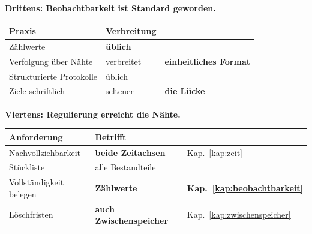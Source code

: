 \begin{aktuell}
\medskip
\textbf{Drittens: Beobachtbarkeit ist Standard geworden.}

\begin{center}
\renewcommand{\arraystretch}{1.45}
\begin{tabular}{@{}P{3.0cm}P{2.2cm}P{2.6cm}@{}}
\toprule
\textbf{Praxis} & \textbf{Verbreitung} & \\
\midrule
Zählwerte & \textcolor{gruen}{\textbf{üblich}} & \\
Verfolgung über Nähte & \textcolor{gruen}{verbreitet} & \textbf{einheitliches Format}\\
Strukturierte Protokolle & \textcolor{gruen}{üblich} & \\
Ziele schriftlich & \textcolor{mittel}{seltener} & \textcolor{akzent}{\textbf{die Lücke}}\\
\bottomrule
\end{tabular}
\end{center}

\begin{center}
\begin{minipage}{0.86\textwidth}
\end{minipage}
\end{center}

\medskip
\textbf{Viertens: Regulierung erreicht die Nähte.}

\begin{center}
\renewcommand{\arraystretch}{1.45}
\begin{tabular}{@{}P{3.0cm}P{2.2cm}P{2.6cm}@{}}
\toprule
\textbf{Anforderung} & \textbf{Betrifft} & \\
\midrule
Nachvollzieh\-barkeit & \textbf{beide Zeitachsen} & \textcolor{gruen}{Kap.~\ref{kap:zeit}}\\
Stückliste & alle Bestandteile & \\
Vollständigkeit belegen & \textbf{Zählwerte} & \textcolor{gruen}{\textbf{Kap.~\ref{kap:beobachtbarkeit}}}\\
Löschfristen & \textbf{auch Zwischenspeicher} & \textcolor{akzent}{Kap.~\ref{kap:zwischenspeicher}}\\
\bottomrule
\end{tabular}
\end{center}

\begin{center}
\end{center}


\end{aktuell}
